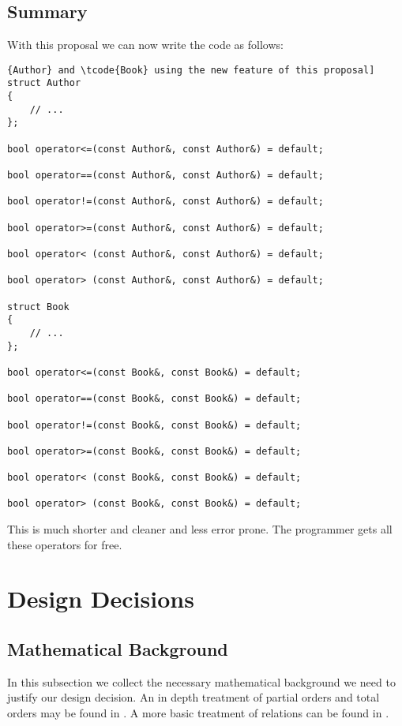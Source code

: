 ﻿\documentclass[a4paper,11pt,twoside,final]{article}
\newcommand{\tcode}[1]{\lstinline[basicstyle=\normalsize\ttfamily]{#1}}
\numberwithin{equation}{subsection}
\begin{document}
\subsection{Summary}
With this proposal we can now write the code as follows:
\begin{lstlisting}[caption=Implementation of relational and equality operators for \tcode{Author} and \tcode{Book} using the new feature of this proposal]
struct Author
{
    // ...
};

bool operator<=(const Author&, const Author&) = default;

bool operator==(const Author&, const Author&) = default;

bool operator!=(const Author&, const Author&) = default;

bool operator>=(const Author&, const Author&) = default;

bool operator< (const Author&, const Author&) = default;

bool operator> (const Author&, const Author&) = default;

struct Book
{
    // ...
};

bool operator<=(const Book&, const Book&) = default;

bool operator==(const Book&, const Book&) = default;

bool operator!=(const Book&, const Book&) = default;

bool operator>=(const Book&, const Book&) = default;

bool operator< (const Book&, const Book&) = default;

bool operator> (const Book&, const Book&) = default;
\end{lstlisting}

This is much shorter and cleaner and less error prone. The programmer gets all these operators for free.

\section{Design Decisions}
\subsection{Mathematical Background}
In this subsection we collect the necessary mathematical background we need to justify our design decision. An in depth treatment of partial orders and total orders may be found in \citet[chapitre III]{bourbaki}. A more basic treatment of relations can be found in \citet[chapter 4]{HowToProveIt}.
\end{document}
